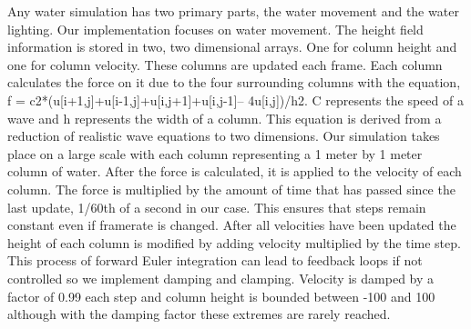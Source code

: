 \documentclass[12pt,titlepage]{article}
\begin{document}
Any water simulation has two primary parts, the water movement and the water 
lighting.  Our implementation focuses on water movement.  The height field 
information is stored in two, two dimensional arrays.  One for column height 
and one for column velocity.  These columns are updated each frame.  Each 
column calculates the force on it due to the four surrounding columns with the 
equation, f = c2*(u[i+1,j]+u[i-1,j]+u[i,j+1]+u[i,j-1]– 4u[i,j])/h2.  C 
represents the speed of a wave and h represents the width of a column.  This 
equation is derived from a reduction of realistic wave equations to two 
dimensions.  Our simulation takes place on a large scale with each column 
representing a 1 meter by 1 meter column of water.  After the force is 
calculated, it is applied to the velocity of each column.  The force is 
multiplied by the amount of time that has passed since the last update, 1/60th 
of a second in our case.  This ensures that steps remain constant even if 
framerate is changed.  After all velocities have been updated the height of 
each column is modified by adding velocity multiplied by the time step.  This 
process of forward Euler integration can lead to feedback loops if not 
controlled so we implement damping and clamping.  Velocity is damped by a 
factor of 0.99 each step and column height is bounded between -100 and 100 
although with the damping factor these extremes are rarely reached.
	
\end{document}
